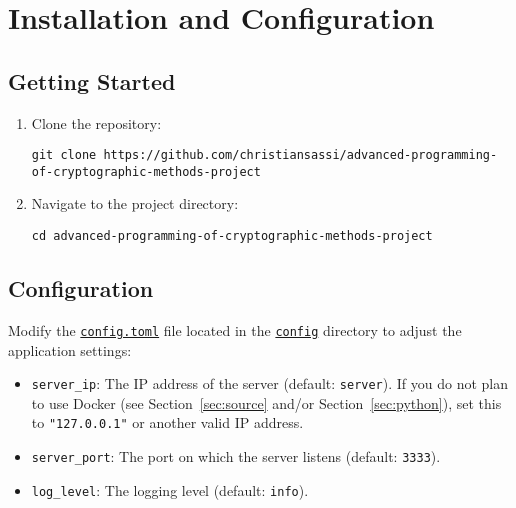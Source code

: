 \chapter{Installation and Configuration}
\label{cha:Installation}

\section{Getting Started}

\begin{enumerate}
    \item Clone the repository:

        \begin{lstlisting}
git clone https://github.com/christiansassi/advanced-programming-of-cryptographic-methods-project
        \end{lstlisting}

    \item Navigate to the project directory:
    
        \begin{lstlisting}
cd advanced-programming-of-cryptographic-methods-project
        \end{lstlisting}
\end{enumerate}

\section{Configuration}

Modify the \href{https://github.com/christiansassi/advanced-programming-of-cryptographic-methods-project/blob/main/config/config.toml}{\texttt{config.toml}} file located in the \href{https://github.com/christiansassi/advanced-programming-of-cryptographic-methods-project/blob/main/config}{\texttt{config}} directory to adjust the application settings:

\begin{itemize}
    \item \texttt{server\_ip}: The IP address of the server (default: \texttt{server}). If you do not plan to use Docker (see Section~\ref{sec:source} and/or Section~\ref{sec:python}), set this to \texttt{"127.0.0.1"} or another valid IP address.
    \item \texttt{server\_port}: The port on which the server listens (default: \texttt{3333}).
    \item \texttt{log\_level}: The logging level (default: \texttt{info}).
\end{itemize}

